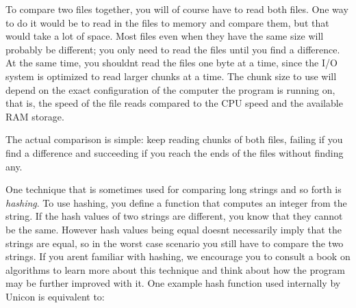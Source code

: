 To compare two files together, you will of course have to read both
files. One way to do it would be to read in the files to memory and
compare them, but that would take a lot of space. Most files even when
they have the same size will probably be different; you only need to
read the files until you find a difference. At the same time, you
shouldn{\textquotesingle}t read the files one byte at a time, since the
I/O system is optimized to read larger chunks at a time. The chunk size
to use will depend on the exact configuration of the computer the
program is running on, that is, the speed of the file reads compared to
the CPU speed and the available RAM storage. 

The actual comparison is simple: keep reading chunks of both files,
failing if you find a difference and succeeding if you reach the ends
of the files without finding any. 


One technique that is sometimes used for comparing long strings and so
forth is \textit{hashing}. To use hashing, you define a
function that computes an integer from the string. If the hash values
of two strings are different, you know that they cannot be the same.
However hash values being equal doesn{\textquotesingle}t necessarily
imply that the strings are equal, so in the worst case scenario you
still have to compare the two strings. If you aren{\textquotesingle}t
familiar with hashing, we encourage you to consult a book on algorithms
to learn more about this technique and think about how the program may
be further improved with it. One example hash function used internally
by Unicon is equivalent to:

